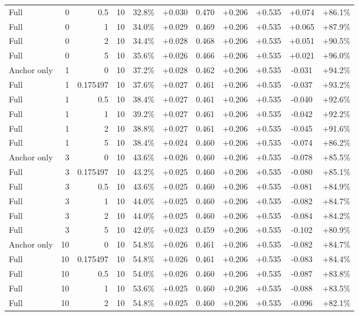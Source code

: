 \begin{table}[htbp]
\begin{tabular}{lrrrccccccc}
Full & 0 & 0.5 & 10 & 32.8\% & +0.030 & 0.470 & +0.206 & +0.535 & +0.074 & +86.1\% \\
Full & 0 & 1 & 10 & 34.0\% & +0.029 & 0.469 & +0.206 & +0.535 & +0.065 & +87.9\% \\
Full & 0 & 2 & 10 & 34.4\% & +0.028 & 0.468 & +0.206 & +0.535 & +0.051 & +90.5\% \\
Full & 0 & 5 & 10 & 35.6\% & +0.026 & 0.466 & +0.206 & +0.535 & +0.021 & +96.0\% \\
Anchor only & 1 & 0 & 10 & 37.2\% & +0.028 & 0.462 & +0.206 & +0.535 & -0.031 & +94.2\% \\
Full & 1 & 0.175497 & 10 & 37.6\% & +0.027 & 0.461 & +0.206 & +0.535 & -0.037 & +93.2\% \\
Full & 1 & 0.5 & 10 & 38.4\% & +0.027 & 0.461 & +0.206 & +0.535 & -0.040 & +92.6\% \\
Full & 1 & 1 & 10 & 39.2\% & +0.027 & 0.461 & +0.206 & +0.535 & -0.042 & +92.2\% \\
Full & 1 & 2 & 10 & 38.8\% & +0.027 & 0.461 & +0.206 & +0.535 & -0.045 & +91.6\% \\
Full & 1 & 5 & 10 & 38.4\% & +0.024 & 0.460 & +0.206 & +0.535 & -0.074 & +86.2\% \\
Anchor only & 3 & 0 & 10 & 43.6\% & +0.026 & 0.460 & +0.206 & +0.535 & -0.078 & +85.5\% \\
Full & 3 & 0.175497 & 10 & 43.2\% & +0.025 & 0.460 & +0.206 & +0.535 & -0.080 & +85.1\% \\
Full & 3 & 0.5 & 10 & 43.6\% & +0.025 & 0.460 & +0.206 & +0.535 & -0.081 & +84.9\% \\
Full & 3 & 1 & 10 & 44.0\% & +0.025 & 0.460 & +0.206 & +0.535 & -0.082 & +84.7\% \\
Full & 3 & 2 & 10 & 44.0\% & +0.025 & 0.460 & +0.206 & +0.535 & -0.084 & +84.2\% \\
Full & 3 & 5 & 10 & 42.0\% & +0.023 & 0.459 & +0.206 & +0.535 & -0.102 & +80.9\% \\
Anchor only & 10 & 0 & 10 & 54.8\% & +0.026 & 0.461 & +0.206 & +0.535 & -0.082 & +84.7\% \\
Full & 10 & 0.175497 & 10 & 54.8\% & +0.026 & 0.461 & +0.206 & +0.535 & -0.083 & +84.4\% \\
Full & 10 & 0.5 & 10 & 54.0\% & +0.026 & 0.460 & +0.206 & +0.535 & -0.087 & +83.8\% \\
Full & 10 & 1 & 10 & 53.6\% & +0.025 & 0.460 & +0.206 & +0.535 & -0.088 & +83.5\% \\
Full & 10 & 2 & 10 & 54.8\% & +0.025 & 0.460 & +0.206 & +0.535 & -0.096 & +82.1\% \\

\end{tabular}
\end{table}
